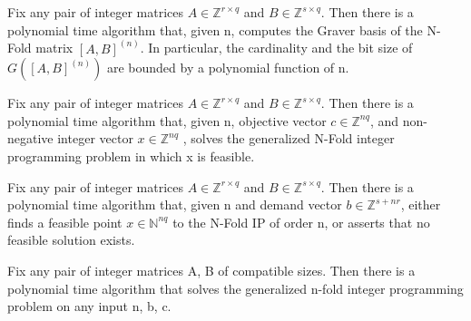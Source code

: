 \begin{proposition}
Fix any pair of integer matrices $A \in \mathbb{Z}^{r \times q}$ and $B \in \mathbb{Z}^{s \times q}$. Then there is a polynomial time algorithm that, given n, computes the Graver basis of the N-Fold matrix $[A,B]^{(n)}$. In particular, the cardinality and the bit size of $G([A, B]^(n))$ are bounded by a polynomial function of n.
\end{proposition}

\begin{proposition}
Fix any pair of integer matrices $A \in \mathbb{Z}^{r \times q}$ and $B \in \mathbb{Z}^{s \times q}$. Then there is a polynomial time algorithm that, given n, objective vector $c \in \mathbb{Z}^{nq}$, and non-negative integer vector $x \in \mathbb{Z}^{nq}$ , solves the generalized N-Fold integer programming problem in which x is feasible.
\end{proposition}

\begin{proposition}
Fix any pair of integer matrices $A \in \mathbb{Z}^{r \times q}$ and $B \in \mathbb{Z}^{s \times q}$. Then there is a polynomial time algorithm that, given n and demand vector $b \in \mathbb{Z}^{s + nr}$, either finds a feasible point $x \in \mathbb{N}^{nq}$ to the N-Fold IP of order n, or asserts that no feasible solution exists.
\end{proposition}


\begin{theorem}
Fix any pair of integer matrices A, B of compatible sizes. Then there is a polynomial time algorithm that solves the generalized n-fold integer programming problem on any input n, b, c.
\end{theorem}

